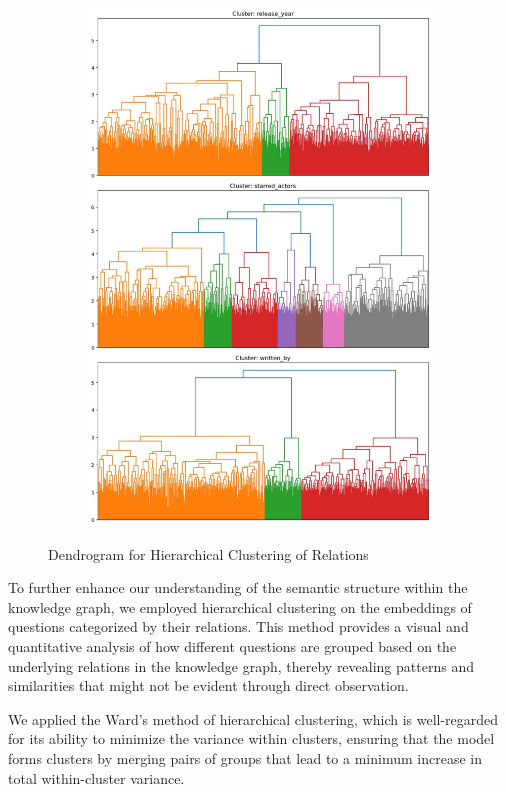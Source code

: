 \documentclass{article}
\begin{document}
\begin{figure}[ht]
\begin{subfigure}[b]{0.3\textwidth}
        \includegraphics[width=\textwidth]{HC3.jpeg}
    \end{subfigure}
    \caption{Dendrogram for Hierarchical Clustering of Relations}
\end{figure}
To further enhance our understanding of the semantic structure within the knowledge graph, we employed hierarchical clustering \textcite{Murtagh_2014} on the embeddings of questions categorized by their relations. This method provides a visual and quantitative analysis of how different questions are grouped based on the underlying relations in the knowledge graph, thereby revealing patterns and similarities that might not be evident through direct observation.

We applied the Ward's method of hierarchical clustering, which is well-regarded for its ability to minimize the variance within clusters, ensuring that the model forms clusters by merging pairs of groups that lead to a minimum increase in total within-cluster variance.
\end{document}
